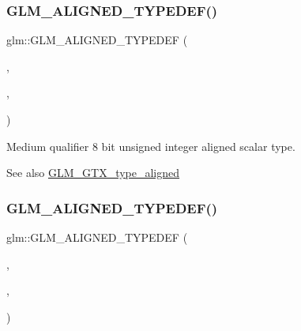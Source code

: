 \subsubsection{\texorpdfstring{G\+L\+M\+\_\+\+A\+L\+I\+G\+N\+E\+D\+\_\+\+T\+Y\+P\+E\+D\+E\+F()}{GLM\_ALIGNED\_TYPEDEF()}\hspace{0.1cm}{\footnotesize\ttfamily [85/209]}}
{\footnotesize\ttfamily glm\+::\+G\+L\+M\+\_\+\+A\+L\+I\+G\+N\+E\+D\+\_\+\+T\+Y\+P\+E\+D\+EF (\begin{DoxyParamCaption}\item[{\hyperlink{group__gtc__type__precision_gadfa38f3c245d371c4b2079f1fd68928b}{mediump\+\_\+uint8\+\_\+t}}]{,  }\item[{aligned\+\_\+mediump\+\_\+uint8\+\_\+t}]{,  }\item[{1}]{ }\end{DoxyParamCaption})}

Medium qualifier 8 bit unsigned integer aligned scalar type. \begin{DoxySeeAlso}{See also}
\hyperlink{group__gtx__type__aligned}{G\+L\+M\+\_\+\+G\+T\+X\+\_\+type\+\_\+aligned} 
\end{DoxySeeAlso}
\mbox{\label{group__gtx__type__aligned_ga1ca98c67f7d1e975f7c5202f1da1df1f}} 
\subsubsection{\texorpdfstring{G\+L\+M\+\_\+\+A\+L\+I\+G\+N\+E\+D\+\_\+\+T\+Y\+P\+E\+D\+E\+F()}{GLM\_ALIGNED\_TYPEDEF()}\hspace{0.1cm}{\footnotesize\ttfamily [86/209]}}
{\footnotesize\ttfamily glm\+::\+G\+L\+M\+\_\+\+A\+L\+I\+G\+N\+E\+D\+\_\+\+T\+Y\+P\+E\+D\+EF (\begin{DoxyParamCaption}\item[{\hyperlink{group__gtc__type__precision_ga0b385466deac5ac96061ef2cdd6db20f}{mediump\+\_\+uint16\+\_\+t}}]{,  }\item[{aligned\+\_\+mediump\+\_\+uint16\+\_\+t}]{,  }\item[{2}]{ }\end{DoxyParamCaption})}

